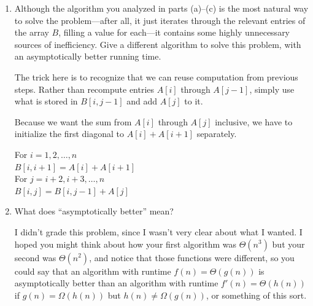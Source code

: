 \documentclass[11pt]{article}
\begin{document}
\begin{enumerate}
\begin{enumerate}
\item

Although the algorithm you
    analyzed in parts (a)--(c) is the most natural way to solve the
    problem---after all, it just iterates through the relevant entries of the
    array $B$, filling a value for each---it contains some highly unnecessary
    sources of inefficiency. Give a different algorithm to solve this problem,
    with an asymptotically better running time. 


\begin{Solution}
The trick here is to recognize that we can reuse computation from previous
steps. Rather than recompute entries $A[i]$ through $A[j-1]$, simply use what is
stored in $B[i,j-1]$ and add $A[j]$ to it.

Because we want the sum from $A[i]$ through $A[j]$ inclusive, we have to
initialize the first diagonal to $A[i] + A[i+1]$ separately.

\begin{algo}
   For $i = 1, 2, \ldots, n$\+ \\
   $B[i,i+1] = A[i] + A[i+1]$ \\
   For $j = i + 2, i + 3, \ldots, n$\+ \\
   $B[i,j] = B[i,j-1] + A[j]$\- \\
\end{algo}
\end{Solution}

\item What does ``asymptotically better'' mean?
\begin{Solution}
I didn't grade this problem, since I wasn't very clear about what I wanted. I hoped
you might think about how your first algorithm was $\Theta(n^3)$ but your second was $\Theta(n^2)$,
and notice that those functions were different, so you could say that an algorithm with runtime $f(n) = \Theta(g(n))$
is asymptotically better than an algorithm with runtime $f'(n) = \Theta(h(n))$ if $g(n) = \Omega(h(n))$ 
but $h(n) \neq \Omega(g(n))$, or something of this sort.

\end{Solution}

\end{enumerate}


\end{enumerate}
\end{document}
